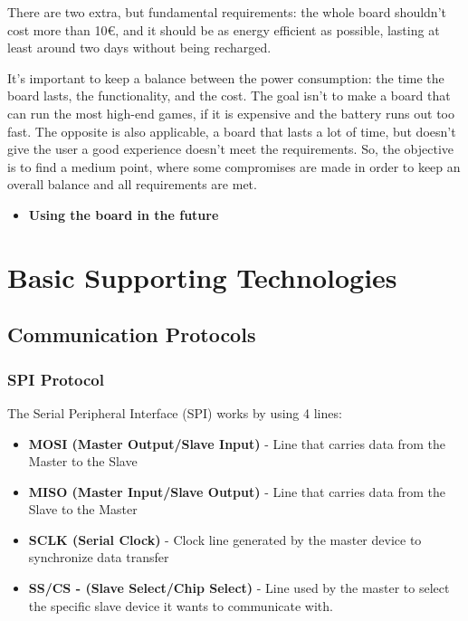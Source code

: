 \documentclass[english]{ist-thesis}
\begin{document}
There are two extra, but fundamental requirements: the whole board shouldn't cost more than 10€, and it should be as energy efficient as possible, lasting at least around two days without being recharged. 

It's important to keep a balance between the power consumption: the time the board lasts, the functionality, and the cost. The goal isn't to make a board that can run the most high-end games, if it is expensive and the battery runs out too fast. The opposite is also applicable, a board that lasts a lot of time, but doesn't give the user a good experience doesn't meet the requirements. So, the objective is to find a medium point, where some compromises are made in order to keep an overall balance and all requirements are met.  

\begin{itemize}
  \item \textbf{Using the board in the future}
\end{itemize}


\chapter{Basic Supporting Technologies}

\section{Communication Protocols}

\subsection{SPI Protocol}

The Serial Peripheral Interface (SPI) works by using 4 lines:

\begin{itemize}
  \item \textbf{MOSI (Master Output/Slave Input)} - Line that carries data from the Master to the Slave
  \item \textbf{MISO (Master Input/Slave Output)} - Line that carries data from the Slave to the Master
  \item \textbf{SCLK (Serial Clock)} - Clock line generated by the master device to synchronize data transfer
  \item \textbf{SS/CS - (Slave Select/Chip Select)} - Line used by the master to select the specific slave device it wants to communicate with.
\end{itemize}
\end{document}
